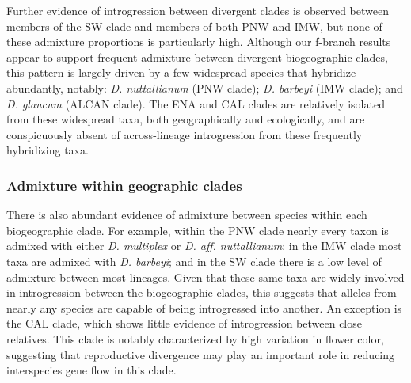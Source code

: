 \documentclass[11pt]{article}
\begin{document}
Further evidence of introgression between divergent clades is observed between
members of the SW clade and members of both PNW and IMW, but none of these 
admixture proportions is particularly high.
% 
Although our f-branch results appear to support frequent admixture between divergent
biogeographic clades, this pattern is largely driven by a few widespread species that
hybridize abundantly, notably: \emph{D. nuttallianum} (PNW clade); 
\emph{D. barbeyi} (IMW clade); 
and \emph{D. glaucum} (ALCAN clade). 
% 
The ENA and CAL clades are relatively isolated from these widespread taxa, both 
geographically and ecologically, and are conspicuously absent of across-lineage
introgression from these frequently hybridizing taxa.



\subsubsection{Admixture within geographic clades}

There is also abundant evidence of admixture between species within each 
biogeographic clade.
% 
For example, within the PNW clade nearly every taxon is admixed with either 
\emph{D. multiplex} or \emph{D. aff. nuttallianum}; in the IMW clade most taxa
are admixed with \emph{D. barbeyi}; and in the SW clade there is a low level of
admixture between most lineages.
% 
Given that these same taxa are widely involved in introgression between the
biogeographic clades, this suggests that alleles from nearly any species are
capable of being introgressed into another.
% 
An exception is the CAL clade, which shows little evidence of introgression between 
close relatives. 
This clade is notably characterized by high variation in flower color, 
suggesting that reproductive divergence may play an important role in 
reducing interspecies gene flow in this clade.
\end{document}

